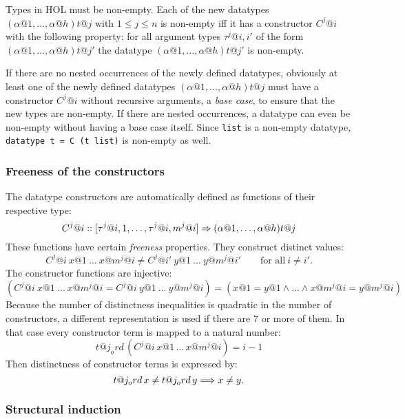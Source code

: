 \medskip

Types in HOL must be non-empty. Each of the new datatypes
$(\alpha@1,\ldots,\alpha@h)t@j$ with $1 \le j \le n$ is non-empty iff it has a
constructor $C^j@i$ with the following property: for all argument types
$\tau^j@{i,i'}$ of the form $(\alpha@1,\ldots,\alpha@h)t@{j'}$ the datatype
$(\alpha@1,\ldots,\alpha@h)t@{j'}$ is non-empty.

If there are no nested occurrences of the newly defined datatypes, obviously
at least one of the newly defined datatypes $(\alpha@1,\ldots,\alpha@h)t@j$
must have a constructor $C^j@i$ without recursive arguments, a \emph{base
  case}, to ensure that the new types are non-empty. If there are nested
occurrences, a datatype can even be non-empty without having a base case
itself. Since \texttt{list} is a non-empty datatype, \texttt{datatype t = C (t
  list)} is non-empty as well.


\subsubsection{Freeness of the constructors}

The datatype constructors are automatically defined as functions of their
respective type:
\[ C^j@i :: [\tau^j@{i,1},\dots,\tau^j@{i,m^j@i}] \To (\alpha@1,\dots,\alpha@h)t@j \]
These functions have certain {\em freeness} properties.  They construct
distinct values:
\[
C^j@i~x@1~\dots~x@{m^j@i} \neq C^j@{i'}~y@1~\dots~y@{m^j@{i'}} \qquad
\mbox{for all}~ i \neq i'.
\]
The constructor functions are injective:
\[
(C^j@i~x@1~\dots~x@{m^j@i} = C^j@i~y@1~\dots~y@{m^j@i}) =
(x@1 = y@1 \land \dots \land x@{m^j@i} = y@{m^j@i})
\]
Because the number of distinctness inequalities is quadratic in the number of
constructors, a different representation is used if there are $7$ or more of
them.  In that case every constructor term is mapped to a natural number:
\[
t@j_ord \, (C^j@i \, x@1 \, \dots \, x@{m^j@i}) = i - 1
\]
Then distinctness of constructor terms is expressed by:
\[
t@j_ord \, x \neq t@j_ord \, y \Longrightarrow x \neq y.
\]

\subsubsection{Structural induction}

